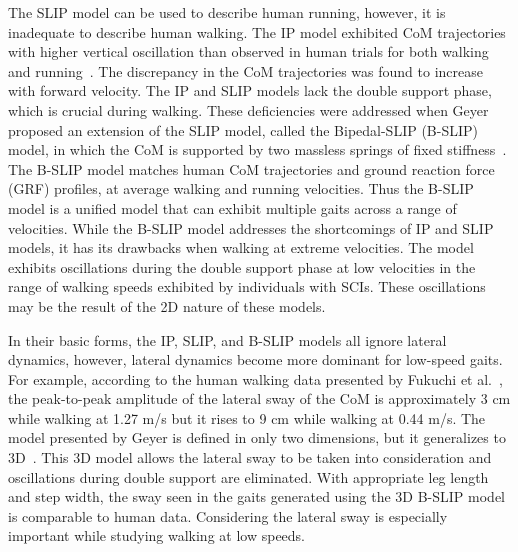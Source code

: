 The SLIP model can be used to describe human running, however, it is inadequate to describe human walking. The IP model exhibited CoM trajectories with higher vertical oscillation than observed in human trials for both walking and running~\cite{lee1998determinants}. The discrepancy in the CoM trajectories was found to increase with forward velocity. The IP and SLIP models lack the double support phase, which is crucial during walking. These deficiencies were addressed when Geyer proposed an extension of the SLIP model, called the Bipedal-SLIP (B-SLIP) model, in which the CoM is supported by two massless springs of fixed stiffness~\cite{geyer2006compliant}. The  B-SLIP model matches human CoM trajectories and ground reaction force (GRF) profiles, at average walking and running velocities. Thus the B-SLIP model is a unified model that can exhibit multiple gaits across a range of velocities. While the B-SLIP model addresses the shortcomings of IP and SLIP models, it has its drawbacks when walking at extreme velocities. The model exhibits oscillations during the double support phase at low velocities in the range of walking speeds exhibited by individuals with SCIs. These oscillations may be the result of the 2D nature of these models.

In their basic forms, the IP, SLIP, and B-SLIP models all ignore lateral dynamics, however, lateral dynamics become more dominant for low-speed gaits. For example, according to the human walking data presented by Fukuchi et al.~\cite{fukuchi2018public}, the peak-to-peak amplitude of the lateral sway of the CoM is approximately 3 cm while walking at 1.27 m/s but it rises to 9 cm while walking at 0.44 m/s. The model presented by Geyer is defined in only two dimensions, but it generalizes to 3D~\cite{liu2015dynamic}. This 3D model allows the lateral sway to be taken into consideration and oscillations during double support are eliminated. With appropriate leg length and step width, the sway seen in the gaits generated using the 3D B-SLIP model is comparable to human data. Considering the lateral sway is especially important while studying walking at low speeds. 

